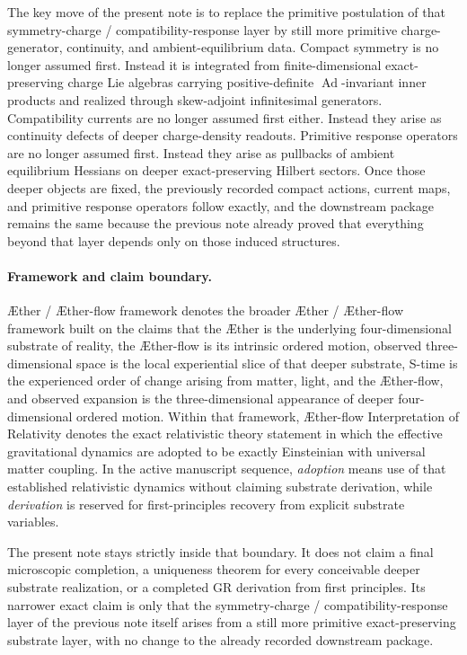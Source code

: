 \documentclass[11pt]{article}
\newcommand{\Aether}{\AE{}ther}
\newcommand{\Aflow}{\AE{}ther-flow}
\newcommand{\TheoryName}{\Aflow{} Interpretation of Relativity}
\newcommand{\TheoryProgram}{\Aether{} / \Aflow{} framework}
\begin{document}
The key move of the present note is to replace the primitive postulation of that symmetry-charge / compatibility-response layer by still more primitive charge-generator, continuity, and ambient-equilibrium data. Compact symmetry is no longer assumed first. Instead it is integrated from finite-dimensional exact-preserving charge Lie algebras carrying positive-definite \(\operatorname{Ad}\)-invariant inner products and realized through skew-adjoint infinitesimal generators. Compatibility currents are no longer assumed first either. Instead they arise as continuity defects of deeper charge-density readouts. Primitive response operators are no longer assumed first. Instead they arise as pullbacks of ambient equilibrium Hessians on deeper exact-preserving Hilbert sectors. Once those deeper objects are fixed, the previously recorded compact actions, current maps, and primitive response operators follow exactly, and the downstream package remains the same because the previous note already proved that everything beyond that layer depends only on those induced structures.

\paragraph{Framework and claim boundary.}
\TheoryProgram{} denotes the broader \Aether{} / \Aflow{} framework built on the claims that the \Aether{} is the underlying four-dimensional substrate of reality, the \Aflow{} is its intrinsic ordered motion, observed three-dimensional space is the local experiential slice of that deeper substrate, S-time is the experienced order of change arising from matter, light, and the \Aflow{}, and observed expansion is the three-dimensional appearance of deeper four-dimensional ordered motion. Within that framework, \TheoryName{} denotes the exact relativistic theory statement in which the effective gravitational dynamics are adopted to be exactly Einsteinian with universal matter coupling. In the active manuscript sequence, \emph{adoption} means use of that established relativistic dynamics without claiming substrate derivation, while \emph{derivation} is reserved for first-principles recovery from explicit substrate variables.

The present note stays strictly inside that boundary. It does not claim a final microscopic completion, a uniqueness theorem for every conceivable deeper substrate realization, or a completed GR derivation from first principles. Its narrower exact claim is only that the symmetry-charge / compatibility-response layer of the previous note itself arises from a still more primitive exact-preserving substrate layer, with no change to the already recorded downstream package.
\end{document}
